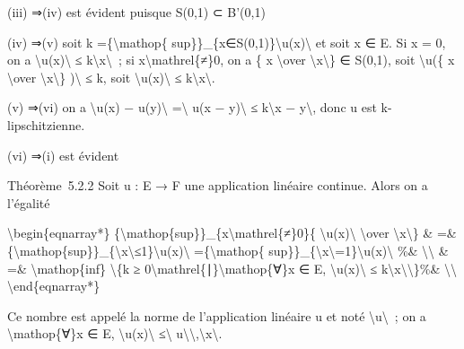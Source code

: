\documentclass[]{article}
\begin{document}
(iii) ⇒(iv) est évident puisque S(0,1) ⊂ B'(0,1)

(iv) ⇒(v) soit k =\{\textbackslash{}mathop\{
sup\}\}\_\{x∈S(0,1)\}\textbackslash{}\textbar{}u(x)\textbackslash{}\textbar{}
et soit x ∈ E. Si x = 0, on a
\textbackslash{}\textbar{}u(x)\textbackslash{}\textbar{} ≤
k\textbackslash{}\textbar{}x\textbackslash{}\textbar{}~; si
x\textbackslash{}mathrel\{≠\}0, on a \{ x \textbackslash{}over
\textbackslash{}\textbar{}x\textbackslash{}\textbar{}\} ∈ S(0,1), soit
\textbackslash{}\textbar{}u(\{ x \textbackslash{}over
\textbackslash{}\textbar{}x\textbackslash{}\textbar{}\}
)\textbackslash{}\textbar{} ≤ k, soit
\textbackslash{}\textbar{}u(x)\textbackslash{}\textbar{} ≤
k\textbackslash{}\textbar{}x\textbackslash{}\textbar{}.

(v) ⇒(vi) on a \textbackslash{}\textbar{}u(x) −
u(y)\textbackslash{}\textbar{} =\textbackslash{}\textbar{} u(x −
y)\textbackslash{}\textbar{} ≤ k\textbackslash{}\textbar{}x −
y\textbackslash{}\textbar{}, donc u est k-lipschitzienne.

(vi) ⇒(i) est évident

Théorème~5.2.2 Soit u : E → F une application linéaire continue. Alors
on a l'égalité

\textbackslash{}begin\{eqnarray*\}
\{\textbackslash{}mathop\{sup\}\}\_\{x\textbackslash{}mathrel\{≠\}0\}\{
\textbackslash{}\textbar{}u(x)\textbackslash{}\textbar{}
\textbackslash{}over
\textbackslash{}\textbar{}x\textbackslash{}\textbar{}\} \& =\&
\{\textbackslash{}mathop\{sup\}\}\_\{\textbackslash{}\textbar{}x\textbackslash{}\textbar{}≤1\}\textbackslash{}\textbar{}u(x)\textbackslash{}\textbar{}
=\{\textbackslash{}mathop\{
sup\}\}\_\{\textbackslash{}\textbar{}x\textbackslash{}\textbar{}=1\}\textbackslash{}\textbar{}u(x)\textbackslash{}\textbar{}
\%\& \textbackslash{}\textbackslash{} \& =\&
\textbackslash{}mathop\{inf\} \textbackslash{}\{k ≥
0\textbackslash{}mathrel\{∣\}\textbackslash{}mathop\{∀\}x ∈ E,
\textbackslash{}\textbar{}u(x)\textbackslash{}\textbar{} ≤
k\textbackslash{}\textbar{}x\textbackslash{}\textbar{}\textbackslash{}\}\%\&
\textbackslash{}\textbackslash{} \textbackslash{}end\{eqnarray*\}

Ce nombre est appelé la norme de l'application linéaire u et noté
\textbackslash{}\textbar{}u\textbackslash{}\textbar{}~; on a
\textbackslash{}mathop\{∀\}x ∈ E,
\textbackslash{}\textbar{}u(x)\textbackslash{}\textbar{}
≤\textbackslash{}\textbar{}
u\textbackslash{}\textbar{}\textbackslash{},\textbackslash{}\textbar{}x\textbackslash{}\textbar{}.
\end{document}
